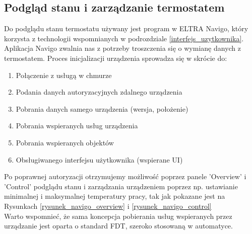 \documentclass[a4paper,10pt]{article}
\begin{document}
\subsection{Podgląd stanu i zarządzanie termostatem}

Do podglądu stanu termostatu używany jest program w ELTRA Navigo\cite{EltraNavigoGooglePlay}, który korzysta z technologii wspomnianych w podrozdziale  \ref{interfejs_uzytkownika}.\\
Aplikacja Navigo zwalnia nas z potrzeby troszczenia się o wymianę danych z termostatem. Proces inicjalizacji urządzenia sprowadza się w skrócie do:

\begin{enumerate}
    \item Połączenie z usługą w chmurze
    \item Podania danych autoryzacyjnych zdalnego urządzenia
    \item Pobrania danych samego urządzenia (wersja, położenie)
    \item Pobrania wspieranych usług urządzenia \cite{FDTWiki}
    \item Pobrania wspieranych objektów \cite{CANOpenDictWiki}
    \item Obsługiwanego interfejsu użytkownika (wspierane UI)
\end{enumerate}

Po poprawnej autoryzacji otrzymujemy możliwość poprzez panele 'Overview' i 'Control' podglądu stanu i zarządzania urządzeniem poprzez np. ustawianie minimalnej i maksymalnej temperatury pracy, tak jak pokazane jest na Rysunkach \ref{rysunek_navigo_overview} i \ref{rysunek_navigo_control}\\
Warto wspomnieć, że sama koncepcja pobierania usług wspieranych przez urządzanie jest oparta o standard FDT\cite{FDTWiki}, szeroko stosowaną w automatyce.
\end{document}
